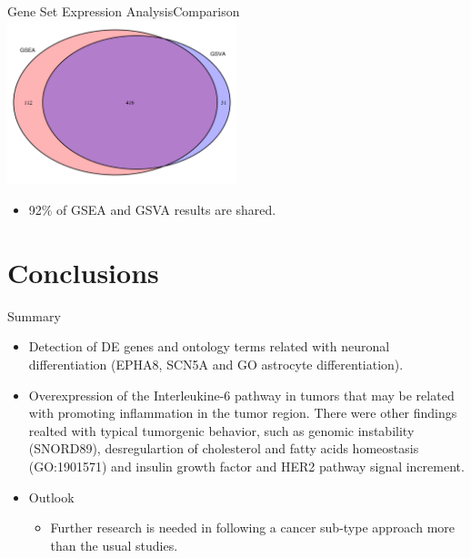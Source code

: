 \documentclass{beamer}
\begin{document}
\begin{frame}{Gene Set Expression Analysis}{Comparison}
  \centering
  \includegraphics[width=0.5\textwidth,height=0.5\textheight,keepaspectratio]{venn}
  \begin{itemize}
    \item
      92\% of GSEA and GSVA results are shared. 
  \end{itemize}

    
\end{frame}




\section{Conclusions}

\begin{frame}{Summary}
  \begin{itemize}
  \item
    Detection of DE genes and ontology terms related with neuronal differentiation (EPHA8, SCN5A and GO astrocyte differentiation). 
  \vspace{10pt}
  \item
    Overexpression of the Interleukine-6 pathway in tumors that may be related with promoting inflammation in the tumor region. There were other findings realted with typical tumorgenic behavior, such as genomic instability (SNORD89), desregulartion of cholesterol and fatty acids homeostasis (GO:1901571) and insulin growth factor and HER2 pathway signal increment. 

  \end{itemize}
  
  \begin{itemize}
  \item
    Outlook
    \begin{itemize}
    \item
      Further research is needed in following a cancer sub-type approach more than the usual studies.
    \end{itemize}
  \end{itemize}
\end{frame}
\end{document}
